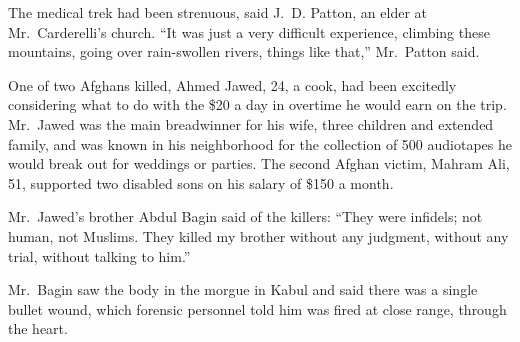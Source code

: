﻿\documentclass[12pt]{article}
\begin{document}
The medical trek had been strenuous, said J.~D. Patton, an elder at Mr.~Carderelli's church. ``It
was just a very difficult experience, climbing these mountains, going over rain-swollen rivers,
things like that,'' Mr.~Patton said.

One of two Afghans killed, Ahmed Jawed, 24, a cook, had been excitedly considering what to do with
the \$20 a day in overtime he would earn on the trip. Mr.~Jawed was the main breadwinner for his
wife, three children and extended family, and was known in his neighborhood for the collection of
500 audiotapes he would break out for weddings or parties. The second Afghan victim, Mahram Ali, 51,
supported two disabled sons on his salary of \$150 a month.

Mr.~Jawed's brother Abdul Bagin said of the killers: ``They were infidels; not human, not Muslims.
They killed my brother without any judgment, without any trial, without talking to him.''

Mr.~Bagin saw the body in the morgue in Kabul and said there was a single bullet wound, which
forensic personnel told him was fired at close range, through the heart.


\end{document}
